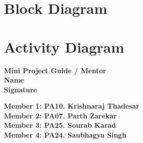 \documentclass[11pt]{article}
\begin{document}
\section{Block Diagram}

\section{Activity Diagram}

\vfill
\begin{minipage}[t]{0.5\textwidth}
    \raggedright
    \textbf{Mini Project Guide / Mentor}\\
    \vspace*{1cm}
    \textbf{Name}\\
    \vspace*{0.5cm}
    \textbf{Signature}
\end{minipage}%
\hfill
\begin{minipage}[t]{0.5\textwidth}
    \raggedright
    \textbf{Member 1: PA10. Krishnaraj Thadesar }\\
    \vspace*{0.9cm}
    \textbf{Member 2: PA07. Parth Zarekar}\\
    \vspace*{0.9cm}
    \textbf{Member 3: PA25. Sourab Karad }\\
    \vspace*{0.9cm}
    \textbf{Member 4: PA24. Saubhagya Singh }\\
    \vspace*{0.9cm}
\end{minipage}

\clearpage

\pagebreak
\end{document}
